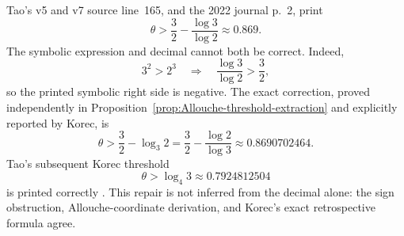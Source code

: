\begin{sourceissue}
\label{sourceissue:Tao-line165-threshold}
Tao's v5 and v7 source line~165, and the 2022 journal p.~2, print
\begin{equation}
\label{eq:Tao-line165-printed}
 \theta>\frac32-\frac{\log3}{\log2}\approx0.869.
\end{equation}
The symbolic expression and decimal cannot both be correct.  Indeed,
\[
 3^2>2^3
 \quad\Longrightarrow\quad
 \frac{\log3}{\log2}>\frac32,
\]
so the printed symbolic right side is negative.  The exact correction,
proved independently in Proposition~\ref{prop:Allouche-threshold-extraction}
and explicitly reported by Korec, is
\begin{equation}
\label{eq:Tao-line165-repaired}
 \boxed{\theta>
 \frac32-\log_3 2
 =\frac32-\frac{\log2}{\log3}}
 \approx0.8690702464.
\end{equation}
Tao's subsequent Korec threshold
\[
 \theta>\log_4 3\approx0.7924812504
\]
is printed correctly \cite[Sec.~1.1, source line~165]{Tao2026v7}.  This
repair is not inferred from the decimal alone: the sign obstruction,
Allouche-coordinate derivation, and Korec's exact retrospective formula
agree.
\end{sourceissue}

